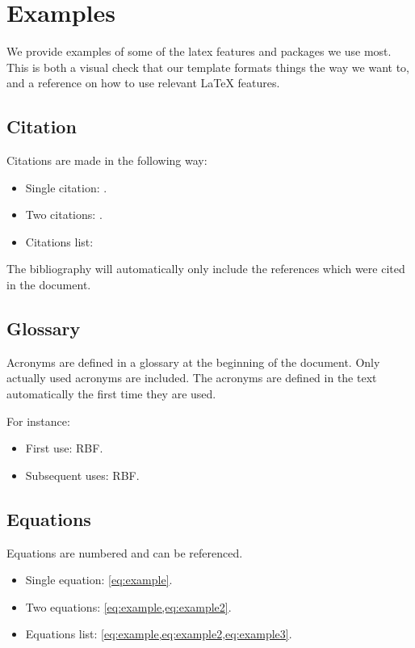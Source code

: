 \section{Examples}
We provide examples of some of the latex features and packages we use most.
This is both a visual check that our template formats things the way we
want to, and a reference on how to use relevant LaTeX features.

\subsection{Citation}
Citations are made in the following way:
\begin{itemize}
\item Single citation: \cite{Gehrels:2016}.
\item Two citations: \cite{inkscape,gnuplot}.
\item Citations list: \cite{inkscape,gnuplot,thomashoullier/alarm-clock}
\end{itemize}

The bibliography will automatically only include the references which
were cited in the document.

\subsection{Glossary}
Acronyms are defined in a glossary at the beginning of the document. Only
actually used acronyms are included. The acronyms are defined in the text
automatically the first time they are used.

For instance:
\begin{itemize}
\item First use: \gls{RBF}.
\item Subsequent uses: \gls{RBF}.
\end{itemize}

\subsection{Equations}
Equations are numbered and can be referenced.
\begin{itemize}
\item Single equation: \cref{eq:example}.
\item Two equations: \cref{eq:example,eq:example2}.
\item Equations list: \cref{eq:example,eq:example2,eq:example3}.
\end{itemize}


